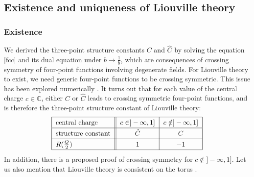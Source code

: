 \documentclass[12pt, a4paper, notitlepage, twoside]{report}
\numberwithin{equation}{section}
\theoremstyle{break}
\begin{document}
\subsection{Existence and uniqueness of Liouville theory}\label{seceul}

\subsubsection{Existence}

We derived the three-point structure constants $C$ and $\hat C$ by solving the equation \eqref{fcc} and its dual equation under $b\to \frac{1}{b}$, which are consequences of crossing symmetry of four-point functions involving degenerate fields. 
For Liouville theory to exist, we need generic four-point functions to be crossing symmetric. 
This issue has been explored numerically \cite{rs15}. 
It turns out that for each value of the central charge $c\in\mathbb{C}$, either $C$ or $\hat C$ leads to crossing symmetric four-point functions, and is therefore the three-point structure constant of Liouville theory:
\begin{align}
\renewcommand{\arraystretch}{1.3}
 \begin{tabular}{|l||c|c|}
  \hline
  central charge &  $c\in ]-\infty, 1]$ & $c\notin ]-\infty, 1]$
  \\
  \hline
  structure constant & $\hat C$  & $C$ 
  \\
  \hline 
  $R(\tfrac{Q}{2})$ & $1$ & $-1$
  \\
  \hline
 \end{tabular}
 \label{ccr}
\end{align}
In addition, there is a proposed proof \cite{tes03b} of crossing symmetry for $c\notin ]-\infty, 1]$.
Let us also mention that Liouville theory is consistent on the torus \cite{hjs09, rs15}. 
\end{document}
